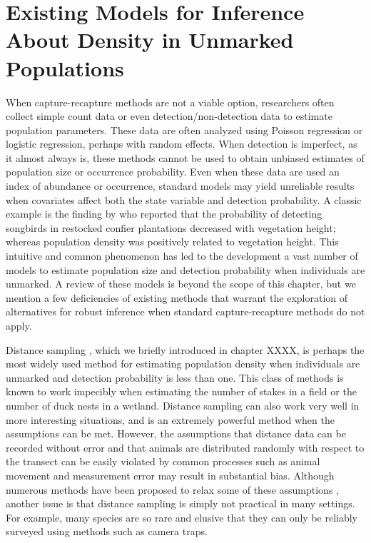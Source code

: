 \section{Existing Models for Inference About Density in Unmarked Populations}

When capture-recapture methods are not a viable option, researchers
often collect simple count data or even detection/non-detection data
to estimate population parameters. These data are often analyzed using
Poisson regression or logistic regression, perhaps with random
effects. When detection is imperfect, as it almost always is,
these methods cannot be used to obtain unbiased estimates of
population size or occurrence probability. Even when these data are
used an index of abundance or occurrence, standard models may yield
unreliable results when covariates affect both the state variable and
detection probability. A classic example is the finding by
\citet{bibby_buckland:1987} who reported that the probability of detecting
songbirds in restocked confier plantations decreased with vegetation
height; whereas population density was positively related to
vegetation height. This intuitive and common phenomenon has led to the
development a vast number of models to estimate population size and
detection probability when individuals are unmarked. A review of these
models is beyond the scope of this
chapter, but we mention a few deficiencies of existing methods
that warrant the exploration of alternatives for robust inference when
standard capture-recapture methods do not apply.

Distance sampling \citep{buckland_etal:2001}, which we briefly introduced in chapter XXXX,
is perhaps the most widely used method for
estimating population density when individuals are unmarked and
detection probability is less than one. This class of methods is known
to work impecibly when estimating the number of stakes in a field or
the number of duck nests in a wetland.
Distance sampling can also work very well in
more interesting situations, and is an extremely powerful method when
the assumptions can be met. However, the assumptions that distance
data can be recorded without error and that animals are distributed
randomly with respect to the transect can be easily violated by
common processes such as animal movement and measurement error may result in
substantial bias. Although numerous methods have been proposed to
relax some of these assumptions
\citet{royle_etal:2004,borchers_etal:1998,johnson_etal:2010,chandler_etal:2011},
another issue is that distance
sampling is simply not practical in many settings. For example, many
species are so rare and elusive that they can only be reliably
surveyed using methods such as camera traps.

